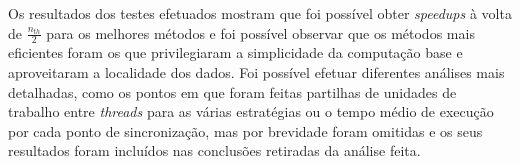 \documentclass[10pt,a4paper,oneside]{article}
\begin{document}
Os resultados dos testes efetuados mostram que foi possível obter {\it
  speedups} à volta de $\frac{n_{th}}{2}$ para os melhores métodos e
foi possível observar que os métodos mais eficientes foram os que
privilegiaram a simplicidade da computação base e aproveitaram a
localidade dos dados. Foi possível efetuar diferentes análises mais
detalhadas, como os pontos em que foram feitas partilhas de unidades
de trabalho entre {\it threads} para as várias estratégias ou o tempo
médio de execução por cada ponto de sincronização, mas por brevidade
foram omitidas e os seus resultados foram incluídos nas conclusões
retiradas da análise feita.

%
%
\end{document}

